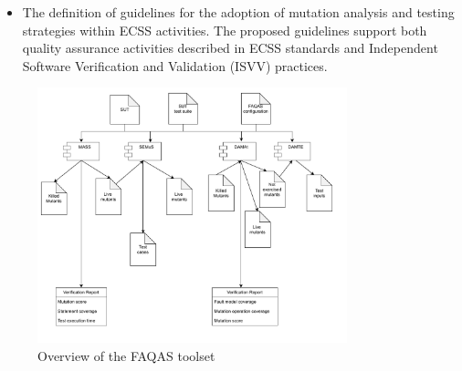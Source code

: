 \begin{itemize}
\item The definition of guidelines for the adoption of mutation analysis and testing strategies within ECSS activities. The proposed guidelines support both quality assurance activities described in ECSS standards and Independent Software Verification and Validation (ISVV) practices.
\end{itemize}

\begin{figure}[tb]
\begin{center}
\includegraphics[width=0.8\textwidth]{images/FAQAS.drawio.pdf}
\caption{Overview of the FAQAS toolset}
\label{fig:FAQAS:toolset_intro}
\end{center}
\end{figure}

